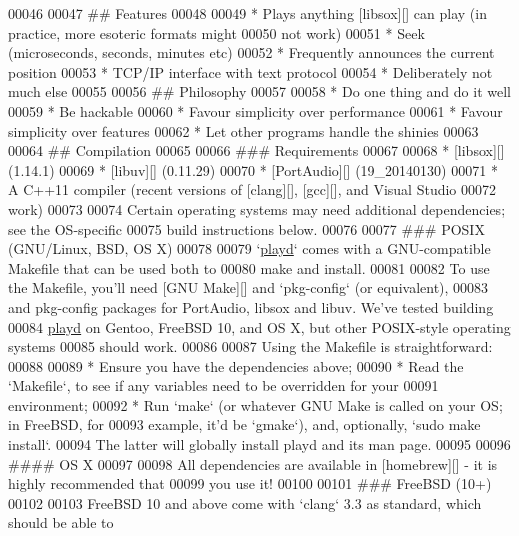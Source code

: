 \begin{DoxyCode}
00046 
00047 ## Features
00048 
00049 * Plays anything [libsox][] can play (in practice, more esoteric formats might
00050   not work)
00051 * Seek (microseconds, seconds, minutes etc)
00052 * Frequently announces the current position
00053 * TCP/IP \textcolor{keyword}{interface }with text protocol
00054 * Deliberately not much \textcolor{keywordflow}{else}
00055 
00056 \textcolor{preprocessor}{## Philosophy}
00057 
00058 * Do one thing and \textcolor{keywordflow}{do} it well
00059 * Be hackable
00060 * Favour simplicity over performance
00061 * Favour simplicity over features
00062 * Let other programs handle the shinies
00063 
00064 \textcolor{preprocessor}{## Compilation}
00065 
00066 \textcolor{preprocessor}{### Requirements}
00067 
00068 * [libsox][] (1.14.1)
00069 * [libuv][] (0.11.29)
00070 * [PortAudio][] (19\_20140130)
00071 * A C++11 compiler (recent versions of [clang][], [gcc][], and Visual Studio
00072   work)
00073 
00074 Certain operating systems may need additional dependencies; see the OS-specific
00075 build instructions below.
00076 
00077 ### POSIX (GNU/Linux, BSD, OS X)
00078 
00079 `\hyperlink{classplayd}{playd}` comes with a GNU-compatible Makefile that can be used both to
00080 make and install.
00081 
00082 To use the Makefile, you\textcolor{stringliteral}{'ll need [GNU Make][] and `pkg-config` (or equivalent),}
00083 \textcolor{stringliteral}{and pkg-config packages for PortAudio, libsox and libuv.  We'}ve tested building
00084 \hyperlink{classplayd}{playd} on Gentoo, FreeBSD 10, and OS X, but other POSIX-style operating systems
00085 should work.
00086 
00087 Using the Makefile is straightforward:
00088 
00089 * Ensure you have the dependencies above;
00090 * Read the `Makefile`, to see \textcolor{keywordflow}{if} any variables need to be overridden \textcolor{keywordflow}{for} your
00091   environment;
00092 * Run `make` (or whatever GNU Make is called on your OS; in FreeBSD, \textcolor{keywordflow}{for}
00093   example, it\textcolor{stringliteral}{'d be `gmake`), and, optionally, `sudo make install`.}
00094 \textcolor{stringliteral}{  The latter will globally install playd and its man page.}
00095 \textcolor{stringliteral}{}
00096 \textcolor{stringliteral}{#### OS X}
00097 \textcolor{stringliteral}{}
00098 \textcolor{stringliteral}{All dependencies are available in [homebrew][] - it is highly recommended that}
00099 \textcolor{stringliteral}{you use it!}
00100 \textcolor{stringliteral}{}
00101 \textcolor{stringliteral}{### FreeBSD (10+)}
00102 \textcolor{stringliteral}{}
00103 \textcolor{stringliteral}{FreeBSD 10 and above come with `clang` 3.3 as standard, which should be able to}

\end{DoxyCode}
